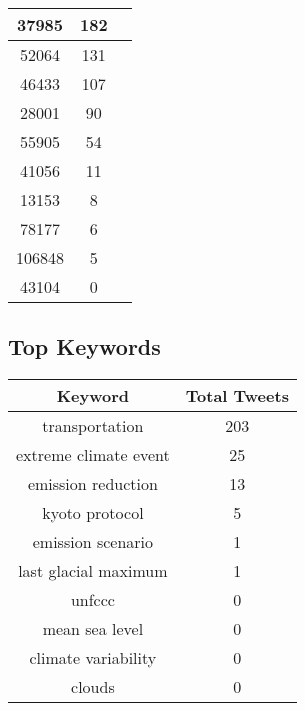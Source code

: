 \documentclass{article}\usepackage[T1]{fontenc}
\begin{document}
\begin{tabular}{|c|c|c|}
 \hline
37985 & 182\\ 
 \hline
52064 & 131\\ 
 \hline
46433 & 107\\ 
 \hline
28001 & 90\\ 
 \hline
55905 & 54\\ 
 \hline
41056 & 11\\ 
 \hline
13153 & 8\\ 
 \hline
78177 & 6\\ 
 \hline
106848 & 5\\ 
 \hline
43104 & 0\\ 
 \hline
\end{tabular}\subsection*{Top Keywords}\begin{tabular}{|c|c|}         \hline         Keyword & Total Tweets \\ 
 \hline
transportation & 203\\ 
 \hline
extreme climate event & 25\\ 
 \hline
emission reduction & 13\\ 
 \hline
kyoto protocol & 5\\ 
 \hline
emission scenario & 1\\ 
 \hline
last glacial maximum & 1\\ 
 \hline
unfccc & 0\\ 
 \hline
mean sea level & 0\\ 
 \hline
climate variability & 0\\ 
 \hline
clouds & 0\\ 
 \hline
\end{tabular}
\end{document}
